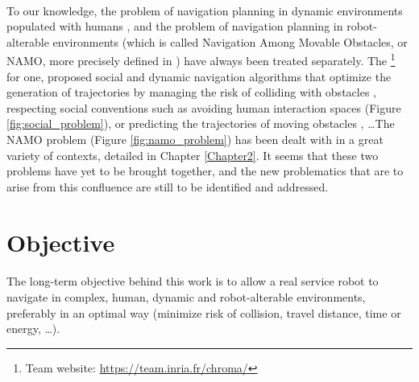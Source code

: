 \paragraph{} To our knowledge, the problem of navigation planning in dynamic environments populated with humans \parencite{kruse_human-aware_2013, rios-martinez_proxemics_2015}, and the problem of navigation planning in robot-alterable environments (which is called Navigation Among Movable Obstacles, or NAMO, more precisely defined in \parencite{stilman_navigation_2007}) have always been treated separately. The \groupname\footnote{Team website: \url{https://team.inria.fr/chroma/}} \, for one, proposed social and dynamic navigation algorithms that optimize the generation of trajectories by managing the risk of colliding with obstacles \parencite{fulgenzi_autonomous_2009, rios-martinez_socially-aware_2013}, respecting social conventions such as avoiding human interaction spaces \parencite{papadakis_adaptive_2014, rios-martinez_understanding_2011} (Figure \ref{fig:social_problem}), or predicting the trajectories of moving obstacles \parencite{jumel_mapping_2017}, \dots The NAMO problem (Figure \ref{fig:namo_problem}) has been dealt with in a great variety of contexts, detailed in Chapter \ref{Chapter2}. It seems that these two problems have yet to be brought together, and the new problematics that are to arise from this confluence are still to be identified and addressed.

\section{Objective}

\paragraph{} The long-term objective behind this work is to allow a real service robot to navigate in complex, human, dynamic and robot-alterable environments, preferably in an optimal way (minimize risk of collision, travel distance, time or energy, \dots).

